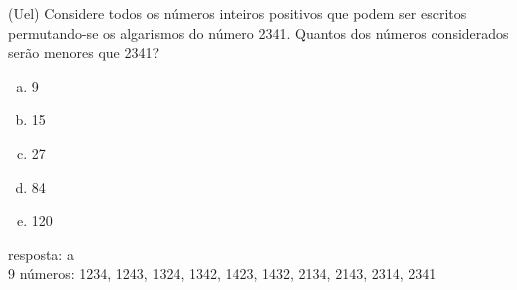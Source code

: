 \begin{ex}
 (Uel) Considere todos os números inteiros positivos que podem ser escritos permutando-se os algarismos do número 2341. Quantos dos números considerados serão menores que 2341?
    \begin{enumerate}[(a)]
    \item 9
    \item 15
    \item 27
    \item 84
    \item 120
    \end{enumerate}
      \begin{sol}
        resposta: a \\
        9 números: 1234, 1243, 1324, 1342, 1423, 1432, 2134, 2143, 2314, 2341
      \end{sol}
\end{ex}